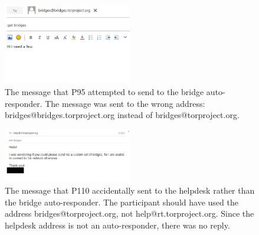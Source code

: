 \documentclass[USenglish,oneside,twocolumn]{article}
\begin{document}
\begin{figure}[h]
\includegraphics[width=0.5\textwidth]{../experiment/processing/failed-participants/20160325-140813-bridgeresponder-redacted.png}
\caption{The message that P95 attempted to send to the bridge auto-responder. The message was sent to the wrong address: bridges@bridges.torproject.org instead of bridges@torproject.org.}
\label{autoresponder1}
\end{figure} 

\begin{figure}[h]
\includegraphics[width=0.5\textwidth]{../experiment/processing/failed-participants/20160328-133857-bridgeresponder-redacted.png}
\caption{The message that P110 accidentally sent to the helpdesk rather than the bridge auto-responder. The participant should have used the address bridges@torproject.org, not help@rt.torproject.org. Since the helpdesk address is not an auto-responder, there was no reply.}
\label{autoresponder2}
\end{figure} 

%
%
\end{document}
